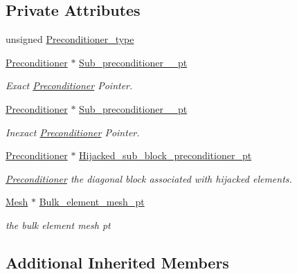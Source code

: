 \subsection*{Private Attributes}
\begin{DoxyCompactItemize}
\item 
unsigned \hyperlink{classoomph_1_1BiharmonicPreconditioner_a9779339955a27e1a98d2808f69e2879d}{Preconditioner\+\_\+type}
\item 
\hyperlink{classoomph_1_1Preconditioner}{Preconditioner} $\ast$ \hyperlink{classoomph_1_1BiharmonicPreconditioner_af48a50ac97077ffe5ec2ec4f0bf113ed}{Sub\+\_\+preconditioner\+\_\+\_\+pt}
\begin{DoxyCompactList}\small\item\em Exact \hyperlink{classoomph_1_1Preconditioner}{Preconditioner} Pointer. \end{DoxyCompactList}\item 
\hyperlink{classoomph_1_1Preconditioner}{Preconditioner} $\ast$ \hyperlink{classoomph_1_1BiharmonicPreconditioner_a1b1f41821ab9b74d1170331934557db7}{Sub\+\_\+preconditioner\+\_\+\_\+pt}
\begin{DoxyCompactList}\small\item\em Inexact \hyperlink{classoomph_1_1Preconditioner}{Preconditioner} Pointer. \end{DoxyCompactList}\item 
\hyperlink{classoomph_1_1Preconditioner}{Preconditioner} $\ast$ \hyperlink{classoomph_1_1BiharmonicPreconditioner_a16f712c1c5ddcd5110f9fad2b10218bc}{Hijacked\+\_\+sub\+\_\+block\+\_\+preconditioner\+\_\+pt}
\begin{DoxyCompactList}\small\item\em \hyperlink{classoomph_1_1Preconditioner}{Preconditioner} the diagonal block associated with hijacked elements. \end{DoxyCompactList}\item 
\hyperlink{classoomph_1_1Mesh}{Mesh} $\ast$ \hyperlink{classoomph_1_1BiharmonicPreconditioner_abc9f6d896b7fec2dee492554c1f64e15}{Bulk\+\_\+element\+\_\+mesh\+\_\+pt}
\begin{DoxyCompactList}\small\item\em the bulk element mesh pt \end{DoxyCompactList}\end{DoxyCompactItemize}
\subsection*{Additional Inherited Members}


